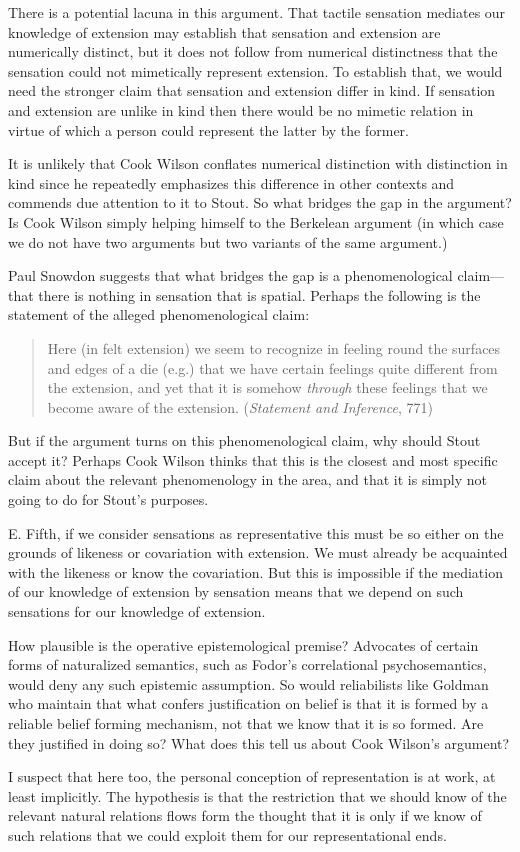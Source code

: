 \documentclass[11pt]{article}
\begin{document}
There is a potential lacuna in this argument. That tactile sensation mediates our knowledge of extension may establish that sensation and extension are numerically distinct, but it does not follow from numerical distinctness that the sensation could not mimetically represent extension. To establish that, we would need the stronger claim that sensation and extension differ in kind. If sensation and extension are unlike in kind then there would be no mimetic relation in virtue of which a person could represent the latter by the former.

It is unlikely that Cook Wilson conflates numerical distinction with distinction in kind since he repeatedly emphasizes this difference in other contexts and commends due attention to it to Stout. So what bridges the gap in the argument? Is Cook Wilson simply helping himself to the Berkelean argument (in which case we do not have two arguments but two variants of the same argument.)

\begin{discussion}
	Paul Snowdon suggests that what bridges the gap is a phenomenological claim---that there is nothing in sensation that is spatial. Perhaps the following is the statement of the alleged phenomenological claim:
	\begin{quote}
		Here (in felt extension) we seem to recognize in feeling round the surfaces and edges of a die (e.g.) that we have certain feelings quite different from the extension, and yet that it is somehow \emph{through} these feelings that we become aware of the extension. (\emph{Statement and Inference}, 771)
	\end{quote}
	But if the argument turns on this phenomenological claim, why should Stout accept it? Perhaps Cook Wilson thinks that this is the closest and most specific claim about the relevant phenomenology in the area, and that it is simply not going to do for Stout's purposes.
\end{discussion}


E. Fifth, if we consider sensations as representative this must be so either on the grounds of likeness or covariation with extension. We must already be acquainted with the likeness or know the covariation. But this is impossible if the mediation of our knowledge of extension by sensation means that we depend on such sensations for our knowledge of extension.

How plausible is the operative epistemological premise? Advocates of certain forms of naturalized semantics, such as Fodor's correlational psychosemantics, would deny any such epistemic assumption. So would reliabilists like Goldman who maintain that what confers justification on belief is that it is formed by a reliable belief forming mechanism, not that we know that it is so formed. Are they justified in doing so? What does this tell us about Cook Wilson's argument?

I suspect that here too, the personal conception of representation is at work, at least implicitly. The hypothesis is that the restriction that we should know of the relevant natural relations flows form the thought that it is only if we know of such relations that we could exploit them for our representational ends.

\end{document}

